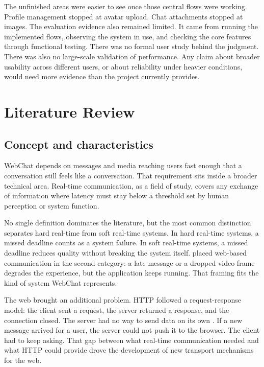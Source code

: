 \documentclass[12pt,a4paper]{article}
\begin{document}
The unfinished areas were easier to see once those central flows were working. Profile management stopped at avatar upload. Chat attachments stopped at images. The evaluation evidence also remained limited. It came from running the implemented flows, observing the system in use, and checking the core features through functional testing. There was no formal user study behind the judgment. There was also no large-scale validation of performance. Any claim about broader usability across different users, or about reliability under heavier conditions, would need more evidence than the project currently provides.

\section{Literature Review}

\subsection{Concept and characteristics}

WebChat depends on messages and media reaching users fast enough that a
conversation still feels like a conversation. That requirement sits inside
a broader technical area. Real-time communication, as a field of study,
covers any exchange of information where latency must stay below a
threshold set by human perception or system function.

No single definition dominates the literature, but the most common
distinction separates hard real-time from soft real-time systems. In hard
real-time systems, a missed deadline counts as a system failure. In soft
real-time systems, a missed deadline reduces quality without breaking the
system itself. \citet{karla2019} placed web-based communication in the
second category: a late message or a dropped video frame degrades the
experience, but the application keeps running. That framing fits the kind
of system WebChat represents.

The web brought an additional problem. HTTP followed a request-response
model: the client sent a request, the server returned a response, and
the connection closed. The server had no way to send data on its own
\citep{loreto2011}. If a new message arrived for a user, the server
could not push it to the browser. The client had to keep asking. That
gap between what real-time communication needed and what HTTP could
provide drove the development of new transport mechanisms for the web.
\end{document}
